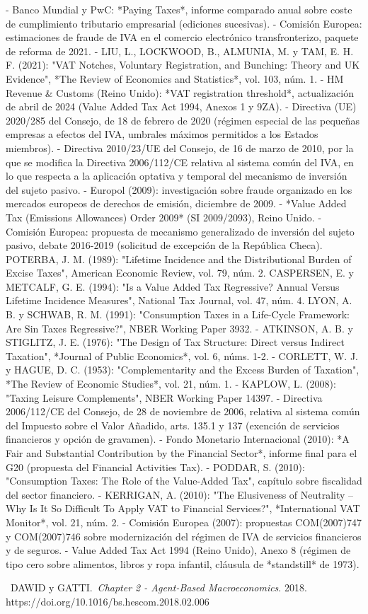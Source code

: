 \documentclass[10pt,a4paper]{article}
\newcounter{myref}
\newcommand{\MyBibItem}[4]{%
  \refstepcounter{myref}%
  \noindent[\themyref]\ #1.\ \emph{#2}. #3. #4\par
}
\begin{document}
- Banco Mundial y PwC: *Paying Taxes*, informe comparado anual sobre coste de cumplimiento tributario empresarial (ediciones sucesivas).
- Comisión Europea: estimaciones de fraude de IVA en el comercio electrónico transfronterizo, paquete de reforma de 2021.
- LIU, L., LOCKWOOD, B., ALMUNIA, M. y TAM, E. H. F. (2021): "VAT Notches, Voluntary Registration, and Bunching: Theory and UK Evidence", *The Review of Economics and Statistics*, vol. 103, núm. 1.
- HM Revenue & Customs (Reino Unido): *VAT registration threshold*, actualización de abril de 2024 (Value Added Tax Act 1994, Anexos 1 y 9ZA).
- Directiva (UE) 2020/285 del Consejo, de 18 de febrero de 2020 (régimen especial de las pequeñas empresas a efectos del IVA, umbrales máximos permitidos a los Estados miembros).
- Directiva 2010/23/UE del Consejo, de 16 de marzo de 2010, por la que se modifica la Directiva 2006/112/CE relativa al sistema común del IVA, en lo que respecta a la aplicación optativa y temporal del mecanismo de inversión del sujeto pasivo.
- Europol (2009): investigación sobre fraude organizado en los mercados europeos de derechos de emisión, diciembre de 2009.
- *Value Added Tax (Emissions Allowances) Order 2009* (SI 2009/2093), Reino Unido.
- Comisión Europea: propuesta de mecanismo generalizado de inversión del sujeto pasivo, debate 2016-2019 (solicitud de excepción de la República Checa).
POTERBA, J. M. (1989): "Lifetime Incidence and the Distributional Burden of Excise Taxes", American Economic Review, vol. 79, núm. 2.
CASPERSEN, E. y METCALF, G. E. (1994): "Is a Value Added Tax Regressive? Annual Versus Lifetime Incidence Measures", National Tax Journal, vol. 47, núm. 4.
LYON, A. B. y SCHWAB, R. M. (1991): "Consumption Taxes in a Life-Cycle Framework: Are Sin Taxes Regressive?", NBER Working Paper 3932.
- ATKINSON, A. B. y STIGLITZ, J. E. (1976): "The Design of Tax Structure: Direct versus Indirect Taxation", *Journal of Public Economics*, vol. 6, núms. 1-2.
- CORLETT, W. J. y HAGUE, D. C. (1953): "Complementarity and the Excess Burden of Taxation", *The Review of Economic Studies*, vol. 21, núm. 1.
- KAPLOW, L. (2008): "Taxing Leisure Complements", NBER Working Paper 14397.
- Directiva 2006/112/CE del Consejo, de 28 de noviembre de 2006, relativa al sistema común del Impuesto sobre el Valor Añadido, arts. 135.1 y 137 (exención de servicios financieros y opción de gravamen).
- Fondo Monetario Internacional (2010): *A Fair and Substantial Contribution by the Financial Sector*, informe final para el G20 (propuesta del Financial Activities Tax).
- PODDAR, S. (2010): "Consumption Taxes: The Role of the Value-Added Tax", capítulo sobre fiscalidad del sector financiero.
- KERRIGAN, A. (2010): "The Elusiveness of Neutrality – Why Is It So Difficult To Apply VAT to Financial Services?", *International VAT Monitor*, vol. 21, núm. 2.
- Comisión Europea (2007): propuestas COM(2007)747 y COM(2007)746 sobre modernización del régimen de IVA de servicios financieros y de seguros.
- Value Added Tax Act 1994 (Reino Unido), Anexo 8 (régimen de tipo cero sobre alimentos, libros y ropa infantil, cláusula de *standstill* de 1973).

\MyBibItem{DAWID y GATTI}{Chapter 2 - Agent-Based Macroeconomics}{2018}{https://doi.org/10.1016/bs.hescom.2018.02.006}


\clearpage
\end{document}
